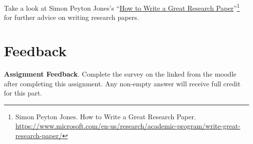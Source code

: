 \documentclass[12pt]{exam}
\begin{document}
\begin{questions}
  Take a look at Simon Peyton Jones's ``\href{https://www.microsoft.com/en-us/research/academic-program/write-great-research-paper/}{How to Write a Great Research Paper}''\footnote{Simon Peyton Jones. How to Write a Great Research Paper. \url{https://www.microsoft.com/en-us/research/academic-program/write-great-research-paper/}} for further advice on writing research papers.

\end{questions}

\section{Feedback}

\begin{questions}
  \question \textbf{Assignment Feedback}. Complete the survey on the linked from the moodle after completing this assignment.  Any non-empty answer
  will receive full credit for this part.
\end{questions}
\end{document}
